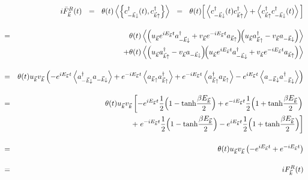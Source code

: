 \documentclass[uplatex,a4j,12pt,dvipdfmx]{jsarticle}
\begin{document}
\begin{eqnarray}
	&&
	i
	\bar{F}_{\vec{k}}^{R}(t)
	\ \ = \ \
	\theta(t)
	\left\langle \left\{
	c_{-\vec{k} \downarrow}^{\dagger}(t), c_{\vec{k} \uparrow}^{\dagger}
	\right\} \right\rangle
	\ \ = \ \
	\theta(t)
	\Big[
		\left\langle
		c_{-\vec{k} \downarrow}^{\dagger}(t) c_{\vec{k} \uparrow}^{\dagger}
		\right\rangle
		+
		\left\langle
		c_{\vec{k} \uparrow}^{\dagger} c_{-\vec{k} \downarrow}^{\dagger}(t)
		\right\rangle
		\Big]
	\nonumber \\[4mm] &=&
	\theta(t)
	\left\langle
	\left(
	u_{\vec{k}} e^{ i E_{\vec{k}} t }
	a_{-\vec{k} \downarrow}^{\dagger}
	+
	v_{\vec{k}} e^{ - i E_{\vec{k}} t }
	a_{\vec{k} \uparrow}
	\right)
	\!\!
	\left(
	u_{\vec{k}} a_{\vec{k} \uparrow}^{\dagger}
	-
	v_{\vec{k}} a_{-\vec{k} \downarrow}
	\right)
	\right\rangle
	\nonumber \\ && \hspace{5mm} +
	\theta(t)
	\left\langle
	\left(
	u_{\vec{k}} a_{\vec{k} \uparrow}^{\dagger}
	-
	v_{\vec{k}} a_{-\vec{k} \downarrow}
	\right)
	\!\!
	\left(
	u_{\vec{k}} e^{ i E_{\vec{k}} t }
	a_{-\vec{k} \downarrow}^{\dagger}
	+
	v_{\vec{k}} e^{ - i E_{\vec{k}} t }
	a_{\vec{k} \uparrow}
	\right)
	\right\rangle
	\nonumber \\[4mm]
	&=&
	\theta(t)
	u_{\vec{k}}
	v_{\vec{k}}
	\left(
	-
	e^{ i E_{\vec{k}} t }
	\left\langle
	a_{-\vec{k} \downarrow}^{\dagger}
	a_{-\vec{k} \downarrow}
	\right\rangle
	+
	e^{ - i E_{\vec{k}} t }
	\left\langle
	a_{\vec{k} \uparrow}
	a_{\vec{k} \uparrow}^{\dagger}
	\right\rangle
	+
	e^{ - i E_{\vec{k}} t }
	\left\langle
	a_{\vec{k} \uparrow}^{\dagger}
	a_{\vec{k} \uparrow}
	\right\rangle
	-
	e^{ i E_{\vec{k}} t }
	\left\langle
	a_{-\vec{k} \downarrow}
	a_{-\vec{k} \downarrow}^{\dagger}
	\right\rangle
	\right)
	\nonumber \\[4mm]
	&=&
	\theta(t)
	u_{\vec{k}}
	v_{\vec{k}}
	\left[
		-
		e^{ i E_{\vec{k}} t }
		\dfrac{1}{2}
		\Big( 1 - {\rm tanh}\dfrac{\beta E_{\vec{k}}}{2} \Big)
		+
		e^{ - i E_{\vec{k}} t }
		\dfrac{1}{2}
		\Big( 1 + {\rm tanh}\dfrac{\beta E_{\vec{k}}}{2} \Big)
		\right.
		\nonumber \\ && \hspace{5mm} +
		\left.
		e^{ - i E_{\vec{k}} t }
		\dfrac{1}{2}
		\Big( 1 - {\rm tanh}\dfrac{\beta E_{\vec{k}}}{2} \Big)
		-
		e^{ i E_{\vec{k}} t }
		\dfrac{1}{2}
		\Big( 1 + {\rm tanh}\dfrac{\beta E_{\vec{k}}}{2} \Big)
		\right]
	\nonumber \\[4mm] &=&
	\theta(t)
	u_{\vec{k}}
	v_{\vec{k}}
	\left(
	-
	e^{ i E_{\vec{k}} t }
	+
	e^{ - i E_{\vec{k}} t }
	\right)
	\nonumber \\[4mm] &=&
	i
	F_{\vec{k}}^{R}(t)
\end{eqnarray}
\end{document}
